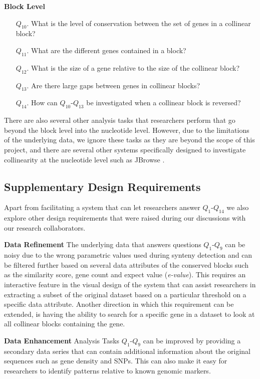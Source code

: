 \smallskip
\noindent
\textbf{Block Level}
\smallskip
\begin{enumerate}
\item [$Q_{10}$.]What is the level of conservation between the set of genes in a collinear block?
\item [$Q_{11}$.] What are the different genes contained in a block?
\item [$Q_{12}$.] What is the size of a gene relative to the size of the collinear block?
\item [$Q_{13}$.] Are there large gaps between genes in collinear blocks?
\item [$Q_{14}$.] How can $Q_{10}$-$Q_{13}$ be investigated when a collinear block is reversed?
\end{enumerate}

There are also several other analysis tasks that researchers perform that go beyond the block level into the nucleotide level. However, due to the limitations of the underlying data, we ignore these tasks as they are beyond the scope of this project, and there are several other systems specifically designed to investigate collinearity at the nucleotide level such as JBrowse \cite{skinner2009jbrowse}.


\subsection{Supplementary Design Requirements}
Apart from facilitating a system that can let researchers answer $Q_1$-$Q_{14}$ we also explore other design requirements that were raised during our discussions with our research collaborators. 

\textbf{Data Refinement} The underlying data that answers questions $Q_1$-$Q_9$ can be noisy due to the wrong parametric values used during synteny detection and can be filtered further based on several data attributes of the conserved blocks such as the similarity score, gene count and expect value (\textit{e-value}). This requires an interactive feature in the visual design of the system that can assist researchers in extracting a subset of the original dataset based on a particular threshold on a specific data attribute. Another direction in which this requirement can be extended, is having the ability to search for a specific gene in a dataset to look at all collinear blocks containing the gene.

\textbf{Data Enhancement} Analysis Tasks $Q_1$-$Q_9$ can be improved by providing a secondary data series that can contain additional information about the original sequences such as gene density and SNPs. This can also make it easy for researchers to identify patterns relative to known genomic markers.

